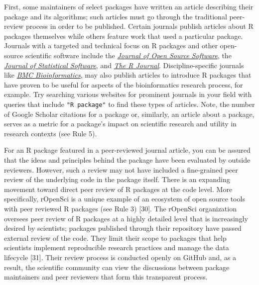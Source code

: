 \documentclass[10pt,letterpaper]{article}
\begin{document}
First, some maintainers of select packages have written an article
describing their package and its algorithms; such articles must go
through the traditional peer-review process in order to be published.
Certain journals publish articles about R packages themselves while
others feature work that used a particular package. Journals with a
targeted and technical focus on R packages and other open-source
scientific software include the
\href{https://joss.theoj.org/}{\emph{Journal of Open Source Software}},
the \href{https://www.jstatsoft.org/index}{\emph{Journal of Statistical
Software}}, and \href{https://journal.r-project.org/}{\emph{The R
Journal}}. Discipline-specific journals like
\href{https://bmcbioinformatics.biomedcentral.com/}{\emph{BMC
Bioinformatics}}, may also publish articles to introduce R packages that
have proven to be useful for aspects of the bioinformatics research
process, for example. Try searching various websites for prominent
journals in your field with queries that include \texttt{"R\ package"}
to find these types of articles. Note, the number of Google Scholar
citations for a package or, similarly, an article about a package,
serves as a metric for a package's impact on scientific research and
utility in research contexts (see Rule 5).

For an R package featured in a peer-reviewed journal article, you can be
assured that the ideas and principles behind the package have been
evaluated by outside reviewers. However, such a review may not have
included a fine-grained peer review of the underlying code in the
package itself. There is an expanding movement toward direct peer review
of R packages at the code level. More specifically, rOpenSci is a unique
example of an ecosystem of open source tools with peer reviewed R
packages (see Rule 3) {[}30{]}. The rOpenSci organization oversees peer
review of R packages at a highly detailed level that is increasingly
desired by scientists; packages published through their repository have
passed external review of the code. They limit their scope to packages
that help scientists implement reproducible research practices and
manage the data lifecycle {[}31{]}. Their review process is conducted
openly on GitHub and, as a result, the scientific community can view the
discussions between package maintainers and peer reviewers that form
this transparent process.
\end{document}
